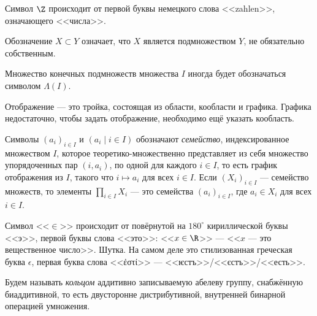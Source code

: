 \documentclass[
	extrafontsizes,
	11pt,
	hyphens,
]{memoir}
\begin{document}
\begin{remark}
Символ \(\Z\) происходит от первой буквы немецкого слова <<\textenglish{zahlen}>>, означающего <<числа>>.
\end{remark}

\begin{notation}
Обозначение \(X \subset Y\) означает, что \(X\) является подмножеством \(Y\), не обязательно собственным.
\end{notation}

\begin{notation}
Множество конечных подмножеств множества \(I\) иногда будет обозначаться символом \(\Lambda(I)\).
\end{notation}

\begin{convention}
Отображение --- это тройка, состоящая из области, кообласти и графика.
Графика недостаточно, чтобы задать отображение, необходимо ещё указать кообласть.
\end{convention}

\begin{notation}
Символы \((a_i)_{i \in I}\) и \((a_i \mid i \in I)\) обозначают \emph{семейство}, индексированное множеством \(I\), которое теоре\-ти\-ко-мно\-жес\-твен\-но представляет из себя множество упорядоченных пар \((i,a_i)\), по одной для каждого \(i \in I\), то есть график отображения из \(I\), такого что \(i \mapsto a_i\) для всех \(i \in I\).
Если \((X_i)_{i \in I}\) --- семейство множеств, то элементы \(\prod_{i \in I} X_i\) --- это семейства \((a_i)_{i \in I}\), где \(a_i \in X_i\) для всех \(i \in I\).
\end{notation}

\begin{remark}
Символ <<\(\in\)>> происходит от повёрнутой на \(180^{\circ}\) кириллической буквы <<э>>, первой буквы слова <<это>>: <<\(x \in \R\)>> --- <<\(x\) --- это вещественное число>>. Шутка. На самом деле это стилизованная греческая буква \(\epsilon\), первая буква слова <<ἐστί>> --- <<ѥстъ>>/<<єстъ>>/<<есть>>.
\end{remark}

\begin{convention} \label{con:Ring}
Будем называть \emph{кольцом} аддитивно записываемую абелеву группу, снабжённую биаддитивной, то есть двусторонне дистрибутивной, внутренней бинарной операцией умножения.
\end{convention}
\end{document}
